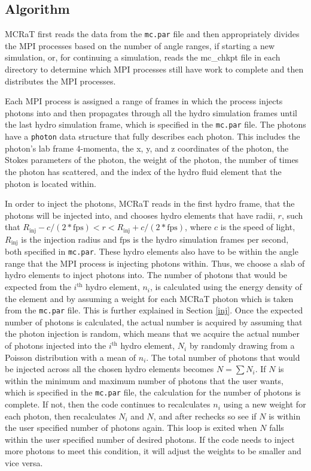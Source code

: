 \documentclass[12pt,a4paper]{article}
\begin{document}
\subsection{Algorithm}\label{algorithm}

MCRaT first reads the data from the \texttt{mc.par} file and then appropriately divides the MPI processes based on the number of angle ranges, if starting a new simulation, or, for continuing a simulation, reads the mc\_chkpt file in each directory to determine which MPI processes still have work to complete and then distributes the MPI processes. 

Each MPI process is assigned a range of frames in which the process injects photons into and then propagates through all the hydro simulation frames until the last hydro simulation frame, which is specified in the \texttt{mc.par} file. The photons have a \texttt{photon} data structure that fully describes each photon. This includes the photon's lab frame 4-momenta, the x, y, and z coordinates of the photon, the Stokes parameters of the photon, the weight of the photon, the number of times the photon has scattered, and the index of the hydro fluid element that the photon is located within.

In order to inject the photons, MCRaT reads in the first hydro frame, that the photons will be injected into, and chooses hydro elements that have radii, $r$, such that $R_\mathrm{inj}-c/(2*\mathrm{fps}) < r < R_\mathrm{inj}+c/(2*\mathrm{fps})$, where $c$ is the speed of light, $R_\mathrm{inj}$ is the injection radius and $\mathrm{fps}$ is the hydro simulation frames per second, both specified in \texttt{mc.par}. These hydro elements also have to be within the angle range that the MPI process is injecting photons within. Thus, we choose a slab of hydro elements to inject photons into. The number of photons that would be expected from the $i^\mathrm{th}$ hydro element, $n_i$, is calculated using the energy density of the element and by assuming a weight for each MCRaT photon which is taken from the \texttt{mc.par} file. This is further explained in Section \ref{inj}. Once the expected number of photons is calculated, the actual number is acquired by assuming that the photon injection is random, which means that we acquire the actual number of photons injected into the $i^\mathrm{th}$ hydro element, $N_i$ by randomly drawing from a Poisson distribution with a mean of $n_i$. The total number of photons that would be injected across all the chosen hydro elements becomes $N=\sum N_i$. If $N$ is within the minimum and maximum number of photons that the user wants, which is specified in the \texttt{mc.par} file, the calculation for the number of photons is complete. If not, then the code continues to recalculates $n_i$ using a new weight for each photon, then recalculates $N_i$ and $N$, and after rechecks so see if $N$ is within the user specified number of photons again. This loop is exited when $N$ falls within the user specified number of desired photons. If the code needs to inject more photons to meet this condition, it will adjust the weights to be smaller and vice versa.
\end{document}
